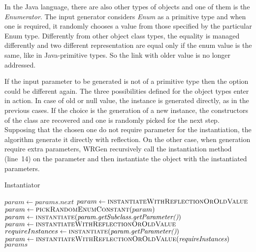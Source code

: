 In the Java language, there are also other types of objects and one of them is the \textit{Enumerator}. The input generator considers \textit{Enum} as a primitive type and when one is required, it randomly chooses a value from those specified by the particular Enum type. 
Differently from other object class types, the equality is managed differently and two different representation are equal only if the enum value is the same, like in Java-primitive types. So the link with older value is no longer addressed.

If the input parameter to be generated is not of a primitive type then the option could be different again.
The three possibilities defined for the object types enter in action. In case of old or null value, the instance is generated directly, as in the previous cases.
If the choice is the generation of a new instance, the constructors of the class are recovered and one is randomly picked for the next step.
Supposing that the chosen one do not require parameter for the instantiation, the algorithm generate it directly with reflection.
On the other case, when generation require extra parameters, WRGen recursively call the instantiation method (line~14) on the parameter and then instantiate the object with the instantiated parameters.
\begin{algorithm}
	\caption{Instantiator}\label{psc:instantiator}
	\begin{algorithmic}[1]
			\State $param \gets \textit{params.next}$
				\State $param \gets \Call{instantiateWithReflectionOrOldValue}{}$
				\State $param \gets \Call{pickRandomEnumConstant}{param}$
				\State $param \gets \Call{instantiate}{\textit{param.getSubclass.getParameter()}}$
			\Else 
					\State $param \gets \Call{instantiateWithReflectionOrOldValue}{}$
				\Else 
					\State $requireInstances \gets \Call{instantiate}{\textit{param.getParameter()}}$
					\State $param \gets \Call{instantiateWithReflectionOrOldValue}{\textit{requireInstances}}$
				\EndIf
			\EndIf	
		\EndFor
		\Return $params$ 
		\EndProcedure
	\end{algorithmic}
\end{algorithm}

